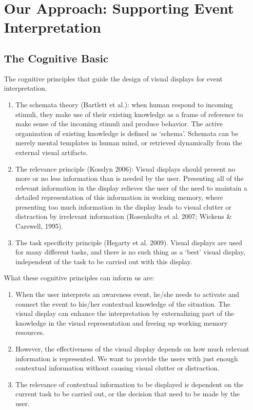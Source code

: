 \graphicspath{{Figures/}}

\chapter{Our Approach: Supporting Event Interpretation} %
\label{cha:event_interpretation}

\section{The Cognitive Basic} %
\label{sec:the_cognitive_basic}
The cognitive principles that guide the design of visual displays for event interpretation.

\begin{enumerate}
	\item The schemata theory (Bartlett et al.): when human respond to incoming stimuli, they make use of their existing knowledge as a frame of reference to make sense of the incoming stimuli and produce behavior. The active organization of existing knowledge is defined as `schema'. Schemata can be merely mental templates in human mind, or retrieved dynamically from the external visual artifacts. 
	\item The relevance principle (Kosslyn 2006): Visual displays should present no more or no less information than is needed by the user. Presenting all of the relevant information in the display relieves the user of the need to maintain a detailed representation of this information in working memory, where presenting too much information in the display leads to visual clutter or distraction by irrelevant information (Rosenholtz et al. 2007; Wickens \& Carswell, 1995).
	\item The task specificity principle (Hegarty et al. 2009). Visual displays are used for many different tasks, and there is no such thing as a `best' visual display, independent of the task to be carried out with this display. 
\end{enumerate}

What these cognitive principles can inform us are:
\begin{enumerate}
	\item When the user interprets an awareness event, he/she needs to activate and connect the event to his/her contextual knowledge of the situation. The visual display can enhance the interpretation by externalizing part of the knowledge in the visual representation and freeing up working memory resources.
	\item However, the effectiveness of the visual display depends on how much relevant information is represented. We want to provide the users with just enough contextual information without causing visual clutter or distraction.
	\item The relevance of contextual information to be displayed is dependent on the current task to be carried out, or the decision that need to be made by the user.

\end{enumerate}

